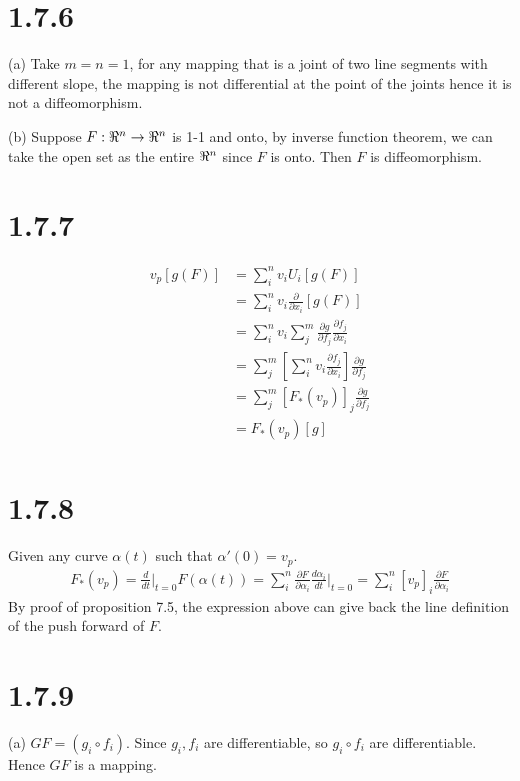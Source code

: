 \documentclass[12pt]{article}
\begin{document}
\section*{1.7.6}
(a) Take $m=n=1$, for any mapping that is a joint of two line segments with different slope, the mapping is not differential at the point of the joints hence it is not a diffeomorphism.

(b) Suppose $F: \real^n \rightarrow \real^n$ is 1-1 and onto, by inverse function theorem, we can take the open set as the entire $\real^n$ since $F$ is onto. Then $F$ is diffeomorphism.

\section*{1.7.7}
$$
\begin{aligned}
	v_p[g(F)] &= \sum^n_{i} v_i U_i[g(F)] \\ 
		&= \sum^n_{i} v_i \frac{\partial}{\partial x_i}[g(F)] \\ 
	   &= \sum^n_{i} v_i \sum^m_j \frac{\partial g}{\partial f_j} \frac{\partial f_j}{\partial x_i} \\
	   &= \sum^m_j  \left[ \sum^n_{i} v_i \frac{\partial f_j}{\partial x_i} \right] \frac{\partial g}{\partial f_j}  \\
	   &= \sum^m_j  \left[ F_*(v_p) \right]_j \frac{\partial g}{\partial f_j}  \\
	   &= F_*(v_p)[g]  \\
\end{aligned}
$$

\section*{1.7.8}
Given any curve $\alpha(t)$ such that $\alpha'(0) = v_p$.
$$
\begin{aligned}
	F_*(v_p) = \frac{d}{dt}\big|_{t=0}F(\alpha(t)) = \sum_i^n \frac{\partial F}{\partial \alpha_i}\frac{d\alpha_i}{dt}\bigg|_{t=0} = \sum_i^n [v_p]_i \frac{\partial F}{\partial \alpha_i}
\end{aligned}
$$
By proof of proposition 7.5, the expression above can give back the line definition of the push forward of $F$.

\section*{1.7.9}
(a) $GF = (g_i \circ f_i)$. Since $g_i, f_i$ are differentiable, so $g_i \circ f_i$ are differentiable. Hence $GF$ is a mapping.
\end{document}

